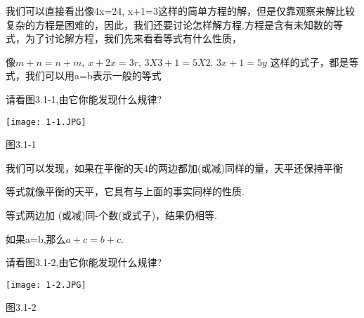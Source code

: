 \documentclass[11pt]{article}
\begin{document}
我们可以直接看出像4x=24, x+1=3这样的简单方程的解，但是仅靠观察来解比较复杂的方程是困难的，因此，我们还要讨论怎样解方程.方程是含有未知数的等式，为了讨论解方程，我们先来看看等式有什么性质，

像$m+n=n+m$, $x+2x=3r$, $3X3+1=5X2$. $3x+1=5y$ 这样的式子，都是等式，我们可以用a=b表示一般的等式

请看图3.1-1,由它你能发现什么规律?
\begin{center}
  \texttt{[image: 1-1.JPG]}\\
\end{center}
图3.1-1

我们可以发现，如果在平衡的天4的两边都加(或减)同样的量，天平还保持平衡

等式就像平衡的天平，它具有与上面的事实同样的性质.

	\begin{propertory}
等式两边加 (或减)同-个数(或式子)，结果仍相等.

如果a=b,那么$a+c=b+c$.
	\end{propertory}

请看图3.1-2,由它你能发现什么规律?
\begin{center}
  \texttt{[image: 1-2.JPG]}\\
\end{center}
图3.1-2
\end{document}
